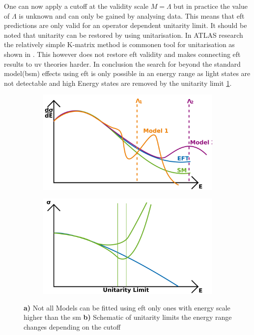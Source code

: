 \documentclass[../Bachelorarbeit.tex]{subfiles}
\begin{document}
\newpage
One can now apply a cutoff at the validity scale $M=\Lambda$ but in practice the value of $\Lambda$ is unknown and can only be gained by analysing data. This means that \acrshort{eft} predictions are only valid for an operator dependent unitarity limit.
It should be noted that unitarity can be restored by using unitarisation. In ATLAS research the relatively simple K-matrix method is commonen tool for unitarisation as shown in \cite{Kilian.2015}. This however does not restore \acrshort{eft} validity and
makes connecting \acrshort{eft} results to \acrshort{uv} theories harder. In conclusion the search for beyond the standard model(\acrshort{bsm}) effects using \acrshort{eft} is only possible in an energy range as light states are not detectable and high Energy states are removed by the unitarity limit \ref{fig:EFT_validity}.
\begin{figure}[h]
    \centering
    \begin{subfigure}{0.45\textwidth}
        \centering
        \includegraphics[width=\textwidth]{images/EFT_validity.png}
        \caption{}
    \end{subfigure}
    \begin{subfigure}{0.45\textwidth}
        \centering
        \includegraphics[width=\textwidth]{images/EFT_cross_section.png}
        \caption{}
    \end{subfigure}
    \caption{\textbf{a)} Not all Models can be fitted using \acrshort{eft} only ones with energy scale higher than the \acrshort{sm} \textbf{b)} Schematic of unitarity limits the energy range changes depending on the cutoff \cite{MichaSzleper.} }
    \label{fig:EFT_validity}
\end{figure}
\end{document}

